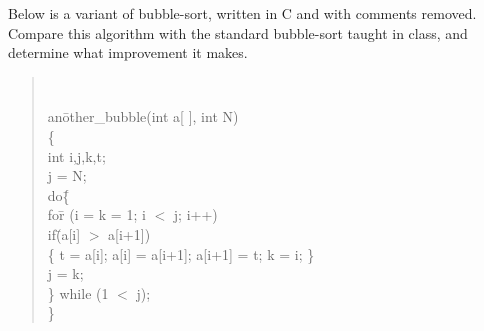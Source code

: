 Below is a variant of bubble-sort, written in C and with comments
removed.  Compare this algorithm with the standard bubble-sort taught
in class, and determine what improvement it makes.

\begin {verse} \tt
\begin {tabbing}
%
an\=other\_bubble(int  a[ ], int N) \\
\>\{  \= \\

\>\>int i,j,k,t; \\

\>\>j = N; \\

\>\>do\= \{ \\

\>\>\>fo\=r (i = k = 1; i $<$ j; i++) \\

\>\>\>\>if\= (a[i] $>$ a[i+1]) \\

\>\>\>\>\>\{ t = a[i]; a[i] = a[i+1]; a[i+1] = t; k = i; \} \\

\>\>\>j = k; \\

\>\>\>\} while (1 $<$ j); \\

\>\} \\
\end {tabbing}
\end {verse}
